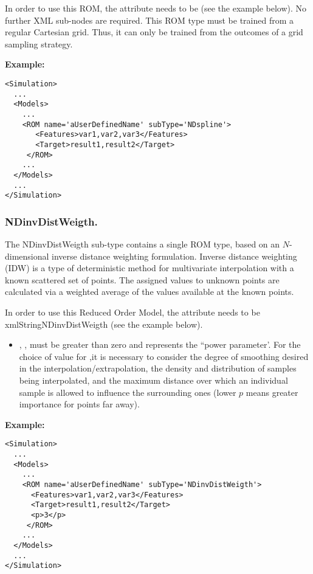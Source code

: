 In order to use this ROM, the  attribute  needs to
be  (see the example below).
%
No further XML sub-nodes are required.
%
\nb This ROM type must be trained from a regular Cartesian grid.
%
Thus, it can only be trained from the outcomes of a grid sampling strategy.

\textbf{Example:}
\begin{lstlisting}[style=XML,morekeywords={name,subType}]
<Simulation>
  ...
  <Models>
    ...
    <ROM name='aUserDefinedName' subType='NDspline'>
       <Features>var1,var2,var3</Features>
       <Target>result1,result2</Target>
     </ROM>
    ...
  </Models>
  ...
</Simulation>
\end{lstlisting}
\subsubsection{NDinvDistWeigth.}
\label{subsubsec:NDinvDistWeigth}
The NDinvDistWeigth sub-type contains a single ROM type, based on an
$N$-dimensional inverse distance weighting formulation.
%
Inverse distance weighting (IDW) is a type of deterministic method for
multivariate interpolation with a known scattered set of points.
%
The assigned values to unknown points are calculated via a weighted average of
the values available at the known points.
%

In order to use this Reduced Order Model, the  attribute
 needs to be xmlString{NDinvDistWeigth} (see the example 
below).
%
\subnodeIntro

\begin{itemize}
  \item {}, , must be greater than
  zero and represents the ``power parameter'.
  For the choice of value for ,it is necessary to consider the degree
  of smoothing desired in the interpolation/extrapolation, the density and
  distribution of samples being interpolated, and the maximum distance over
  which an individual sample is allowed to influence the surrounding ones (lower
  $p$ means greater importance for points far away).
\end{itemize}

\textbf{Example:}
\begin{lstlisting}[style=XML,morekeywords={name,subType}]
<Simulation>
  ...
  <Models>
    ...
    <ROM name='aUserDefinedName' subType='NDinvDistWeigth'>
      <Features>var1,var2,var3</Features>
      <Target>result1,result2</Target>
      <p>3</p>
     </ROM>
    ...
  </Models>
  ...
</Simulation>
\end{lstlisting}
